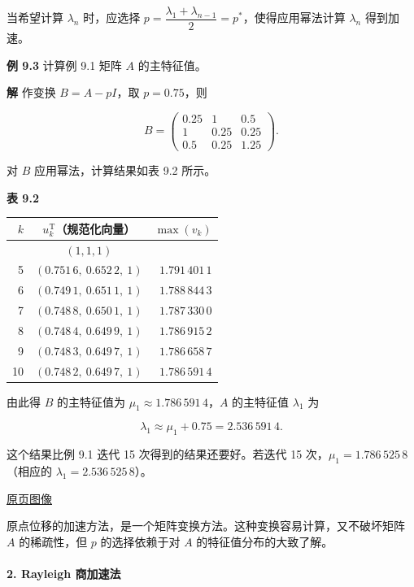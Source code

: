 \documentclass[
  10pt,
  fontset=fandol]{ctexart}
\newcounter{none} %
\begin{document}
当希望计算 \(\lambda_n\) 时，应选择 \(p=\dfrac{\lambda_1+\lambda_{n-1}}{2}=p^*\)，使得应用幂法计算 \(\lambda_n\) 得到加速。

\textbf{例 9.3} 计算例 9.1 矩阵 \(A\) 的主特征值。

\textbf{解} 作变换 \(B=A-pI\)，取 \(p=0.75\)，则

\[
B=\begin{pmatrix}
0.25&1&0.5\\
1&0.25&0.25\\
0.5&0.25&1.25
\end{pmatrix}.
\]

对 \(B\) 应用幂法，计算结果如表 9.2 所示。

\textbf{表 9.2}

{\def\LTcaptype{none} %
\begin{longtable}[]{@{}rcr@{}}
\toprule\noalign{}
\(k\) & \(u_k^{\mathrm T}\)（规范化向量） & \(\max(v_k)\) \\
\midrule\noalign{}
\endhead
\bottomrule\noalign{}
\endlastfoot
0 & \((1,1,1)\) & \\
5 & \((0.751\,6,\ 0.652\,2,\ 1)\) & \(1.791\,401\,1\) \\
6 & \((0.749\,1,\ 0.651\,1,\ 1)\) & \(1.788\,844\,3\) \\
7 & \((0.748\,8,\ 0.650\,1,\ 1)\) & \(1.787\,330\,0\) \\
8 & \((0.748\,4,\ 0.649\,9,\ 1)\) & \(1.786\,915\,2\) \\
9 & \((0.748\,3,\ 0.649\,7,\ 1)\) & \(1.786\,658\,7\) \\
10 & \((0.748\,2,\ 0.649\,7,\ 1)\) & \(1.786\,591\,4\) \\
\end{longtable}
}

由此得 \(B\) 的主特征值为 \(\mu_1\approx1.786\,591\,4\)，\(A\) 的主特征值 \(\lambda_1\) 为

\[
\lambda_1\approx\mu_1+0.75=2.536\,591\,4.
\]

这个结果比例 9.1 迭代 15 次得到的结果还要好。若迭代 15 次，\(\mu_1=1.786\,525\,8\)（相应的 \(\lambda_1=2.536\,525\,8\)）。

\href{../../source-images/pdf-240.jpeg}{原页图像}

原点位移的加速方法，是一个矩阵变换方法。这种变换容易计算，又不破坏矩阵 \(A\) 的稀疏性，但 \(p\) 的选择依赖于对 \(A\) 的特征值分布的大致了解。

\paragraph{2. Rayleigh 商加速法}\label{rayleigh-ux5546ux52a0ux901fux6cd5}
\end{document}
